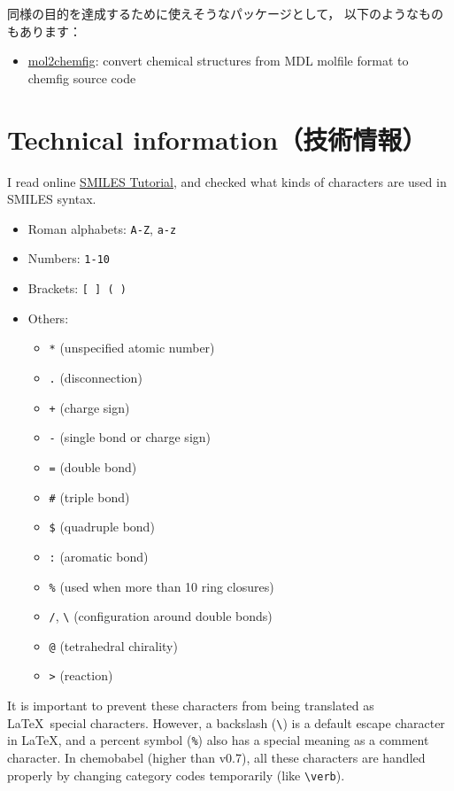 \documentclass[12pt]{ltjsarticle}
\begin{document}
同様の目的を達成するために使えそうなパッケージとして，
以下のようなものもあります：
\begin{itemize}
  \item \href{http://www.ctan.org/pkg/mol2chemfig}{\textsf{mol2chemfig}}:
    convert chemical structures from MDL molfile format
    to \textsf{chemfig} source code
\end{itemize}

\clearpage

\section{Technical information（技術情報）} \label{detail}

I read online
\href{http://www.daylight.com/meetings/summerschool98/course/dave/smiles-intro.html}{SMILES Tutorial},
and checked what kinds of characters are used in SMILES syntax.
\begin{itemize}
\item Roman alphabets: \verb|A-Z|, \verb|a-z|
\item Numbers: \verb|1-10|
\item Brackets: \verb|[ ] ( )|
\item Others:
\begin{itemize}
\item \verb|*| (unspecified atomic number)
\item \verb|.| (disconnection)
\item \verb|+| (charge sign)
\item \verb|-| (single bond or charge sign)
\item \verb|=| (double bond)
\item \verb|#| (triple bond)
\item \verb|$| (quadruple bond)
\item \verb|:| (aromatic bond)
\item \verb|%| (used when more than 10 ring closures)
\item \verb|/|, \verb|\| (configuration around double bonds)
\item \verb|@| (tetrahedral chirality)
\item \verb|>| (reaction)
\end{itemize}
\end{itemize}

It is important to prevent these characters from being translated as
\LaTeX\ special characters.
However, a backslash (\verb|\|) is a default escape character in \LaTeX,
and a percent symbol (\verb|%|) also has a special meaning as a comment character.
In \textsf{chemobabel} (higher than v0.7), all these characters are
handled properly by changing category codes temporarily (like \verb+\verb+). \\
\end{document}
